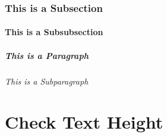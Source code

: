 \documentclass[twoside]{msvreport}%
\begin{document}
\subsection{This is a Subsection}
\blindtext[1]

\subsubsection{This is a Subsubsection}
\blindtext[1]

\paragraph{This is a Paragraph}
\blindtext[1]

\subparagraph{This is a Subparagraph}
\blindtext[1]


\chapter{Check Text Height}
\blindtext[40]

\blindmathtrue
\Blinddocument
\blinddocument


%
\appendix
\blinddocument

\cleardoublepage
% 



\end{document}
